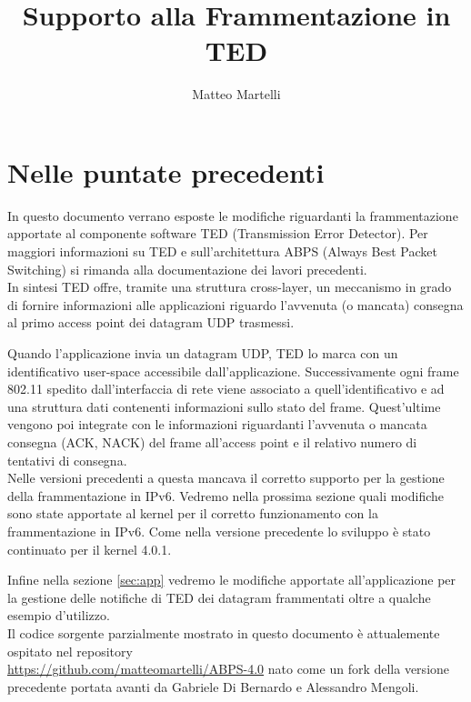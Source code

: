 \documentclass[a4paper,10pt]{article}
\title{Supporto alla Frammentazione in TED }
\author{Matteo Martelli}
\begin{document}
\maketitle


\section{Nelle puntate precedenti}
In questo documento verrano esposte le modifiche riguardanti la
frammentazione apportate al componente software TED 
(Transmission Error Detector). Per maggiori informazioni su TED e
sull’architettura ABPS (Always Best Packet Switching) si rimanda alla documentazione
dei lavori precedenti\cite{dibernardotesi,mengolitesi,abps}.\\

In sintesi TED offre, tramite una struttura cross-layer, un meccanismo in grado di fornire informazioni 
alle applicazioni riguardo l’avvenuta (o mancata) consegna al primo access point dei datagram
UDP trasmessi.

Quando l’applicazione invia un datagram UDP, TED lo marca con un identificativo user-space accessibile 
dall’applicazione. Successivamente ogni frame 802.11 spedito dall’interfaccia di rete viene
associato a quell’identificativo e ad una struttura dati contenenti
informazioni sullo stato del frame.
Quest’ultime vengono poi integrate con le informazioni riguardanti l’avvenuta o mancata consegna (ACK,
NACK) del frame all’access point e il relativo numero di tentativi
di consegna.\\

Nelle versioni precedenti a questa mancava il corretto supporto per la gestione della frammentazione
in IPv6. Vedremo nella prossima sezione quali modifiche sono state apportate al kernel per il corretto
funzionamento con 	 la frammentazione in IPv6. Come nella versione
precedente lo sviluppo è stato continuato per il kernel 4.0.1.

Infine nella sezione \ref{sec:app} vedremo le modifiche apportate all’applicazione per la gestione delle notifiche
di TED dei datagram frammentati oltre a qualche esempio d’utilizzo.\\

Il codice sorgente parzialmente mostrato in questo documento è
attualemente ospitato nel repository \\ 
\url{https://github.com/matteomartelli/ABPS-4.0} nato come un fork della
versione precedente portata avanti da Gabriele Di Bernardo e Alessandro
Mengoli.
\end{document}
